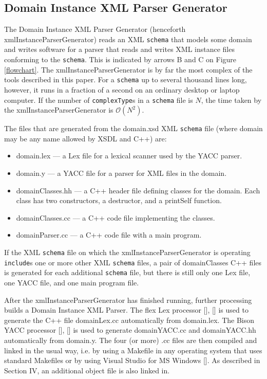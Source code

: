 \documentclass[preprint,12pt]{elsarticle}
\begin{document}
\subsection{Domain Instance XML Parser Generator}
\label{parserGenerator}

The Domain Instance XML Parser Generator (henceforth
xmlInstanceParserGenerator) reads an XML {\tt schema} that models some
domain and writes software for a parser that reads and writes XML instance
files conforming to the {\tt schema}. This is indicated by arrows B and C
on Figure \ref{flowchart}. The xmlInstanceParserGenerator is by far the
most complex of the tools described in this paper. For a {\tt schema} up to
several thousand lines long, however, it runs in a fraction of a second on
an ordinary desktop or laptop computer. If the number of {\tt complexType}s
in a {\tt schema} file is ${N}$, the time taken by the
xmlInstanceParserGenerator is $\mathcal{O}{(N^2)}$.

The files that are generated from the domain.xsd XML {\tt schema} file
(where domain may be any name allowed by XSDL and C++) are:
\begin{itemize}
\item[] domain.lex –-- a Lex file for a lexical scanner used by the YACC parser.
\item[] domain.y --- a YACC file for a parser for XML files in the domain. 
\item[] domainClasses.hh --- a C++ header file defining classes for
      the domain. Each class has two constructors, a destructor, 
      and a printSelf function.
\item[] domainClasses.cc --– a C++ code file implementing the classes.
\item[] domainParser.cc --– a C++ code file with a main program.
\end{itemize}

If the XML {\tt schema} file on which the xmlInstanceParserGenerator is
operating {\tt include}s one or more other XML {\tt schema} files, a pair
of domainClasses C++ files is generated for each additional {\tt schema}
file, but there is still only one Lex file, one YACC file, and one main
program file.

After the xmlInstanceParserGenerator has finished running, further
processing builds a Domain Instance XML Parser. The flex Lex processor
[], [] is used to generate the C++ file
domainLex.cc automatically from domain.lex. The Bison YACC processor
[], [] is used to generate domainYACC.cc
and domainYACC.hh automatically from domain.y. The four (or more) .cc files
are then compiled and linked in the usual way, i.e. by using a Makefile in
any operating system that uses standard Makefiles or by using Visual Studio
for MS Windows []. As described in Section IV, an additional
object file is also linked in.
\end{document}
